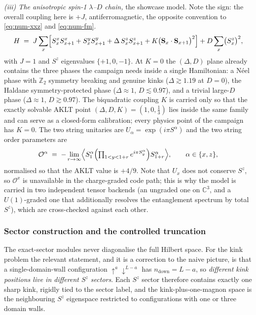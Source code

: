 \emph{(iii) The anisotropic spin-1 $\lambda$--$D$ chain,} the showcase model.
Note the sign: the overall coupling here is $+J$, antiferromagnetic, the
opposite convention to \cref{eq:num-xxz} and \cref{eq:num-fm}.
\begin{equation}
  H \;=\; J\sum_x\Bigl[S^x_xS^x_{x+1} + S^y_xS^y_{x+1} + \Delta\,S^z_xS^z_{x+1}
     + K\bigl(\mathbf{S}_x\cdot\mathbf{S}_{x+1}\bigr)^2\Bigr]
     + D\sum_x\bigl(S^z_x\bigr)^2 ,
  \label{eq:num-lambdaD}
\end{equation}
with $J=1$ and $S^z$ eigenvalues $\{+1,0,-1\}$. At $K=0$ the $(\Delta,D)$
plane already contains the three phases the campaign needs inside a single
Hamiltonian: a N\'eel phase with $\mathbb{Z}_2$ symmetry breaking and genuine
kinks ($\Delta \gtrsim 1.19$ at $D=0$), the Haldane symmetry-protected phase
($\Delta\approx1$, $D\lesssim0.97$), and a trivial large-$D$ phase
($\Delta\approx1$, $D\gtrsim0.97$). The biquadratic coupling $K$ is carried
only so that the exactly solvable AKLT point $(\Delta,D,K)=(1,0,\tfrac13)$
lies inside the same family and can serve as a closed-form calibration; every
physics point of the campaign has $K=0$. The two string unitaries are
$U_\alpha = \exp(i\pi S^\alpha)$ and the two string order parameters are
\begin{equation}
  \mathcal{O}^\alpha \;=\; -\lim_{r\to\infty}
   \Bigl\langle S^\alpha_1 \Bigl(\textstyle\prod_{1<y<1+r} e^{i\pi S^\alpha_y}\Bigr)
   S^\alpha_{1+r}\Bigr\rangle,
  \qquad \alpha \in \{x,z\},
  \label{eq:num-string}
\end{equation}
normalised so that the AKLT value is $+4/9$. Note that $U_x$ does not conserve
$S^z$, so $\mathcal{O}^x$ is unavailable in the charge-graded code path; this
is why the model is carried in two independent tensor backends (an ungraded
one on $\mathbb{C}^3$, and a $U(1)$-graded one that additionally resolves the
entanglement spectrum by total $S^z$), which are cross-checked against each
other.

\subsubsection{Sector construction and the controlled truncation}

The exact-sector modules never diagonalise the full Hilbert space. For the
kink problem the relevant statement, and it is a correction to the naive
picture, is that a single-domain-wall configuration $\uparrow^a\downarrow^{L-a}$
has $n_{\text{down}} = L-a$, so \emph{different kink positions live in
different $S^z$ sectors}. Each $S^z$ sector therefore contains exactly one
sharp kink, rigidly tied to the sector label, and the kink-plus-one-magnon
space is the neighbouring $S^z$ eigenspace restricted to configurations with
one or three domain walls.

